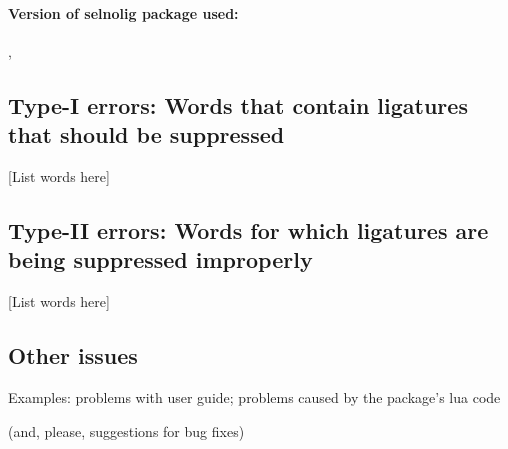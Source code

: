 \documentclass{article}
\begin{document}
\paragraph*{Version of selnolig package used:} 
\selnoligpackageversion, \selnoligpackagedate 

\subsection*{Type-I errors: Words that contain ligatures that should be suppressed}

[List words here]

\subsection*{Type-II errors: Words for which ligatures are being suppressed improperly}

[List words here]

\subsection*{Other issues}

Examples: problems with user guide; problems caused by the package's lua code 

(and, please, suggestions for bug fixes)
\end{document}
